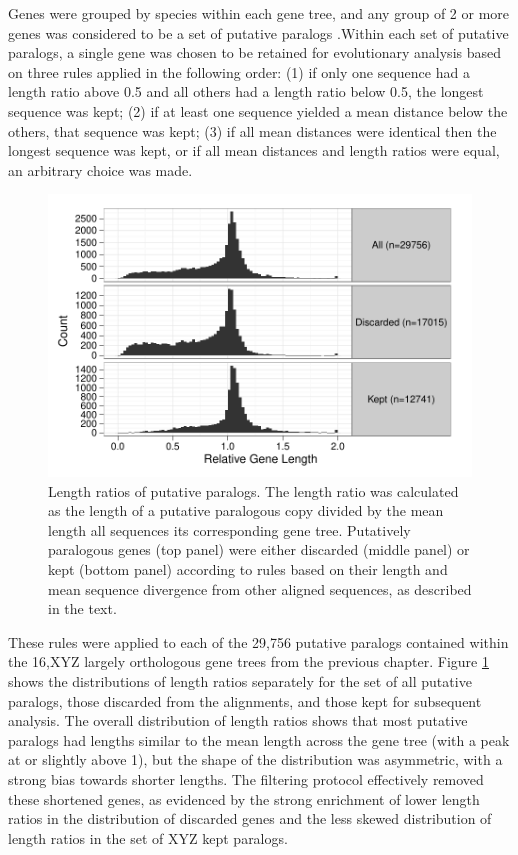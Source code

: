 Genes were grouped by species within each gene tree, and any group of
2 or more genes was considered to be a set of putative paralogs
.Within each set of putative paralogs, a single gene was chosen to be
retained for evolutionary analysis based on three rules applied in the
following order: (1) if only one sequence had a length ratio above 0.5
and all others had a length ratio below 0.5, the longest sequence was
kept; (2) if at least one sequence yielded a mean distance below the
others, that sequence was kept; (3) if all mean distances were
identical then the longest sequence was kept, or if all mean distances
and length ratios were equal, an arbitrary choice was made.

\begin{figure}
\centering
\includegraphics[scale=0.7]{Figs/filtered_paralogs_hist.pdf}
\caption{Length ratios of putative paralogs. The length ratio was
  calculated as the length of a putative paralogous copy divided by
  the mean length all sequences its corresponding gene
  tree. Putatively paralogous genes (top panel) were either discarded
  (middle panel) or kept (bottom panel) according to rules based on
  their length and mean sequence divergence from other aligned
  sequences, as described in the text.}
\label{filtered_paralogs_hist}
\end{figure}

These rules were applied to each of the 29,756 putative paralogs
contained within the 16,XYZ largely orthologous gene trees from the
previous chapter. Figure \ref{filtered_paralogs_hist} shows the
distributions of length ratios separately for the set of all putative
paralogs, those discarded from the alignments, and those kept for
subsequent analysis. The overall distribution of length ratios shows
that most putative paralogs had lengths similar to the mean length
across the gene tree (with a peak at or slightly above 1), but the
shape of the distribution was asymmetric, with a strong bias towards
shorter lengths. The filtering protocol effectively removed these
shortened genes, as evidenced by the strong enrichment of lower length
ratios in the distribution of discarded genes and the less skewed
distribution of length ratios in the set of XYZ kept paralogs.


